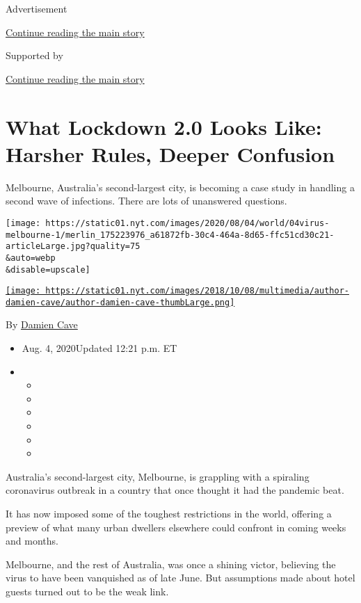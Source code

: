 Advertisement

\protect\hyperlink{after-top}{Continue reading the main story}

Supported by

\protect\hyperlink{after-sponsor}{Continue reading the main story}

\hypertarget{what-lockdown-20-looks-like-harsher-rules-deeper-confusion}{%
\section{What Lockdown 2.0 Looks Like: Harsher Rules, Deeper
Confusion}\label{what-lockdown-20-looks-like-harsher-rules-deeper-confusion}}

Melbourne, Australia's second-largest city, is becoming a case study in
handling a second wave of infections. There are lots of unanswered
questions.

\texttt{[image: https://static01.nyt.com/images/2020/08/04/world/04virus-melbourne-1/merlin\_175223976\_a61872fb-30c4-464a-8d65-ffc51cd30c21-articleLarge.jpg?quality=75\\\&auto=webp\\\&disable=upscale]}

\href{https://www.nytimes.com/by/damien-cave}{\texttt{[image: https://static01.nyt.com/images/2018/10/08/multimedia/author-damien-cave/author-damien-cave-thumbLarge.png]}}

By \href{https://www.nytimes.com/by/damien-cave}{Damien Cave}

\begin{itemize}
\item
  Aug. 4, 2020Updated 12:21 p.m. ET
\item
  \begin{itemize}
  \item
  \item
  \item
  \item
  \item
  \item
  \end{itemize}
\end{itemize}

Australia's second-largest city, Melbourne, is grappling with a
spiraling coronavirus outbreak in a country that once thought it had the
pandemic beat.

It has now imposed some of the toughest restrictions in the world,
offering a preview of what many urban dwellers elsewhere could confront
in coming weeks and months.

Melbourne, and the rest of Australia, was once a shining victor,
believing the virus to have been vanquished as of late June. But
assumptions made about hotel guests turned out to be the weak link.

